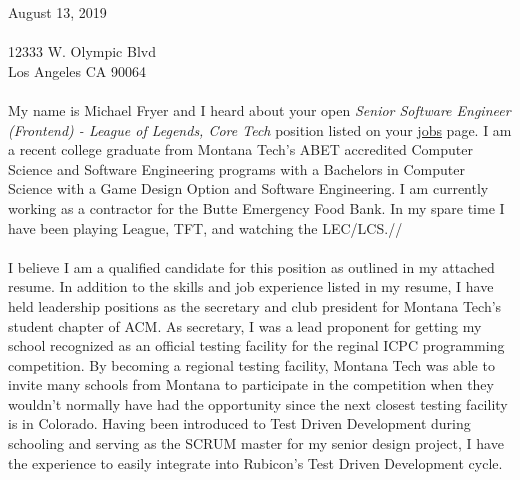 August 13, 2019\\
\mbox{}\\
12333 W. Olympic Blvd\\
Los Angeles CA 90064\\

\paragraph{}
My name is Michael Fryer and I heard about your open \textit{Senior Software Engineer (Frontend) - League of Legends, Core Tech} position listed on your \href{https://www.riotgames.com/en/work-with-us/job/1751728}{jobs} page. I am a recent college graduate from Montana Tech's ABET accredited Computer Science and Software Engineering programs with a Bachelors in Computer Science with a Game Design Option and Software Engineering. I am currently working as a contractor for the Butte Emergency Food Bank. In my spare time I have been playing League, TFT, and watching the LEC/LCS.//

\paragraph{}
I believe I am a qualified candidate for this position as outlined in my attached resume. In addition to the skills and job experience listed in my resume, I have held leadership positions as the secretary and club president for Montana Tech's student chapter of ACM. As secretary, I was a lead proponent for getting my school recognized as an official testing facility for the reginal ICPC programming competition. By becoming a regional testing facility, Montana Tech was able to invite many schools from Montana to participate in the competition when they wouldn't normally have had the opportunity since the next closest testing facility is in Colorado. Having been introduced to Test Driven Development during schooling and serving as the SCRUM master for my senior design project, I have the experience to easily integrate into Rubicon's Test Driven Development cycle.